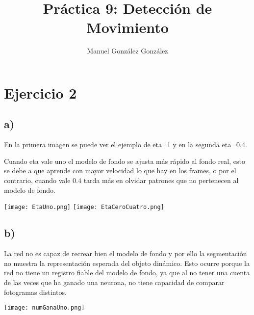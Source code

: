 \documentclass[12pt,a4paper]{article}
\author{Manuel González González}
\title{Práctica 9: Detección de Movimiento}
\begin{document}
\maketitle

\section*{Ejercicio 2}
\subsection*{a)}
En la primera imagen se puede ver el ejemplo de eta=1 y en la segunda eta=0.4.

Cuando eta vale uno el modelo de fondo se ajusta más rápido al fondo real, esto se debe a que aprende con mayor velocidad lo que hay en los frames, o por el contrario, cuando vale 0.4 tarda más en olvidar patrones que no pertenecen al modelo de fondo.

\texttt{[image: EtaUno.png]}
\texttt{[image: EtaCeroCuatro.png]}

\subsection*{b)}
La red no es capaz de recrear bien el modelo de fondo y por ello la segmentación no muestra la representación esperada del objeto dinámico. Esto ocurre porque la red no tiene un registro fiable del modelo de fondo, ya que al no tener una cuenta de las veces que ha ganado una neurona, no tiene capacidad de comparar fotogramas distintos.

\texttt{[image: numGanaUno.png]}
\end{document}

